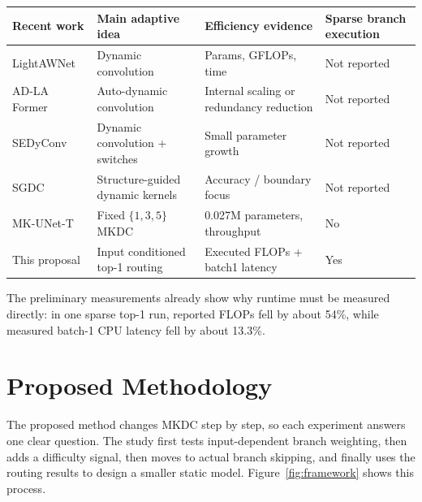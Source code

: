 \documentclass[10pt,a4paper]{article}
\begin{document}
\begin{center}\small
\renewcommand{\arraystretch}{1.08}
\begin{tabularx}{\linewidth}{@{}p{3.50cm}p{4.0cm}p{4.0cm}X@{}}
\toprule
Recent work & Main adaptive idea & Efficiency evidence & Sparse branch execution \\
\midrule
LightAWNet~\cite{wang2025lightawnet} & Dynamic convolution & Params, GFLOPs, time & Not reported \\
AD-LA Former~\cite{wang2025adlaformer} & Auto-dynamic convolution & Internal scaling or redundancy reduction & Not reported \\
SEDyConv~\cite{hao2025sedyconv} & Dynamic convolution + switches & Small parameter growth & Not reported \\
SGDC~\cite{shi2026sgdc} & Structure-guided dynamic kernels & Accuracy / boundary focus & Not reported \\
MK-UNet-T~\cite{rahman2025mkunet} & Fixed $\{1,3,5\}$ MKDC & 0.027M parameters, throughput & No \\
This proposal & Input conditioned top-1 routing & Executed FLOPs + batch1 latency & Yes \\
\bottomrule
\end{tabularx}
\end{center}

The preliminary measurements already show why runtime must be measured directly: in one sparse top-1 run, reported FLOPs fell by about 54\%, while measured batch-1 CPU latency fell by about 13.3\%.

\section{Proposed Methodology}

The proposed method changes MKDC step by step, so each experiment answers one clear question. The study first tests input-dependent branch weighting, then adds a difficulty signal, then moves to actual branch skipping, and finally uses the routing results to design a smaller static model. Figure~\ref{fig:framework} shows this process.
\end{document}
